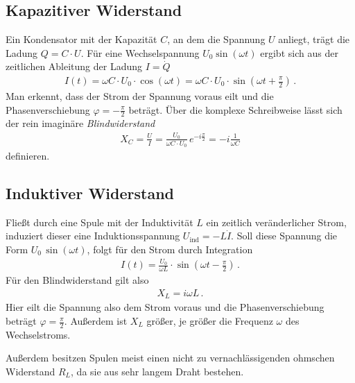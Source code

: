 \documentclass[12pt,a4paper,titlepage,headinclude,bibtotoc]{scrartcl}
\begin{document}
\subsection{Kapazitiver Widerstand}
Ein Kondensator mit der Kapazität $C$, an dem die Spannung $U$ anliegt, trägt die Ladung $Q=C\cdot U$.
Für eine Wechselspannung $U_0\sin(\omega t)$ ergibt sich aus der zeitlichen Ableitung der Ladung $I=\dot{Q}$
\begin{align}
	I(t)=\omega C\cdot U_0\cdot \cos(\omega t)=\omega C\cdot U_0\cdot\sin\left(\omega t+\frac{\pi}{2}\right)\,.
\end{align}
Man erkennt, dass der Strom der Spannung voraus eilt und die Phasenverschiebung $\varphi=-\frac{\pi}{2}$ beträgt.
Über die komplexe Schreibweise lässt sich der rein imaginäre \textit{Blindwiderstand}
\begin{align}
	X_C=\frac{U}{I}= \frac{U_0}{\omega C \cdot U_0}\, e^{-i\frac{\pi}{2}}=-i\frac{1}{\omega C}
\end{align}
definieren.

\subsection{Induktiver Widerstand}
Fließt durch eine Spule mit der Induktivität $L$ ein zeitlich veränderlicher Strom, induziert dieser eine Induktionsspannung $U_\text{ind}=-L\dot{I}$.
Soll diese Spannung die Form $U_0\,\sin(\omega t)$, folgt für den Strom durch Integration
\begin{align}
	I(t)=\frac{U_0}{\omega L}\cdot \sin\left(\omega t-\frac{\pi}{2}\right)\,.
\end{align}
Für den Blindwiderstand gilt also
\begin{align}
	X_L=i\omega L \,.
\end{align}
Hier eilt die Spannung also dem Strom voraus und die Phasenverschiebung beträgt $\varphi=\frac{\pi}{2}$.
Außerdem ist $X_L$ größer, je größer die Frequenz $\omega$ des Wechselstroms.

Außerdem besitzen Spulen meist einen nicht zu vernachlässigenden ohmschen Widerstand $R_L$, da sie aus sehr langem Draht bestehen.
\end{document}
